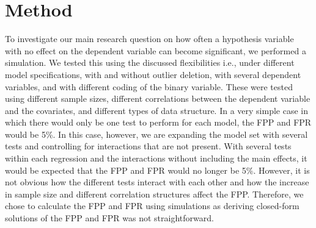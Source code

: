 \section{Method}
To investigate our main research question on how often a hypothesis variable with no effect on the dependent variable can become significant, we performed a simulation. We tested this using the discussed flexibilities i.e., under different model specifications, with and without outlier deletion, with several dependent variables, and with different coding of the binary variable. These were tested using different sample sizes, different correlations between the dependent variable and the covariates, and different types of data structure. In a very simple case in which there would only be one test to perform for each model, the FPP and FPR would be 5\%. In this case, however, we are expanding the model set with several tests and controlling for interactions that are not present. With several tests within each regression and the interactions without including the main effects, it would be expected that the FPP and FPR would no longer be 5\%. However, it is not obvious how the different tests interact with each other and how the increase in sample size and different correlation structures affect the FPP. Therefore, we chose to calculate the FPP and FPR using simulations as deriving closed-form solutions of the FPP and FPR was not straightforward.\\
